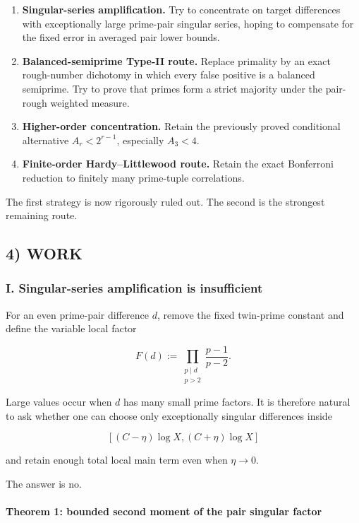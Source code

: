 \begin{enumerate}
\item \textbf{Singular-series amplification.} Try to concentrate on target differences with exceptionally large prime-pair singular series, hoping to compensate for the fixed error in averaged pair lower bounds.

\item \textbf{Balanced-semiprime Type-II route.} Replace primality by an exact rough-number dichotomy in which every false positive is a balanced semiprime. Try to prove that primes form a strict majority under the pair-rough weighted measure.

\item \textbf{Higher-order concentration.} Retain the previously proved conditional alternative \(A_r<2^{r-1}\), especially \(A_3<4\).

\item \textbf{Finite-order Hardy--Littlewood route.} Retain the exact Bonferroni reduction to finitely many prime-tuple correlations.
\end{enumerate}

The first strategy is now rigorously ruled out. The second is the strongest remaining route.

\subsection*{4) WORK}

\subsubsection*{I. Singular-series amplification is insufficient}

For an even prime-pair difference \(d\), remove the fixed twin-prime constant and define the variable local factor

\[
F(d):=
\prod_{\substack{p\mid d\\p>2}}
\frac{p-1}{p-2}.
\tag{1}
\]

Large values occur when \(d\) has many small prime factors. It is therefore natural to ask whether one can choose only exceptionally singular differences inside

\[
[(C-\eta)\log X,(C+\eta)\log X]
\]

and retain enough total local main term even when \(\eta\to0\).

The answer is no.

\paragraph{Theorem 1: bounded second moment of the pair singular factor}

